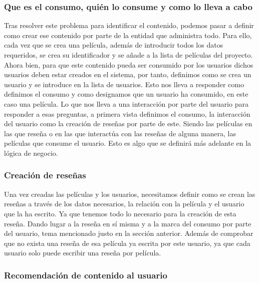 \subsubsection{Que es el consumo, quién lo consume y como lo lleva a cabo}

Tras resolver este problema para identificar el contenido, podemos pasar a definir como crear ese 
contenido por parte de la entidad que administra todo. Para ello, cada vez que se crea una película, 
además de introducir todos los datos requeridos, se crea su identificador y se añade a la lista de 
películas del proyecto. Ahora bien, para que este contenido pueda ser consumido por los usuarios dichos 
usuarios deben estar creados en el sistema, por tanto, definimos como se crea un usuario y se introduce 
en la lista de usuarios. Esto nos lleva a responder como definimos el consumo y como designamos que un 
usuario ha consumido, en este caso una película. Lo que nos lleva a una interacción por parte del 
usuario para responder a esas preguntas, a primera vista definimos el consumo, la interacción del 
usuario como la creación de reseñas por parte de este. Siendo las películas en las que reseña o en las 
que interactúa con las reseñas de alguna manera, las películas que consume el usuario. Esto es algo que 
se definirá más adelante en la lógica de negocio. 

\subsubsection{Creación de reseñas}

Una vez creadas las películas y los usuarios, necesitamos definir como se crean las reseñas a través de 
los datos necesarios, la relación con la película y el usuario que la ha escrito. Ya que tenemos todo 
lo necesario para la creación de esta reseña. Dando lugar a la reseña en sí misma y a la marca del 
consumo por parte del usuario, tema mencionado justo en la sección anterior. Además de comprobar que no 
exista una reseña de esa película ya escrita por este usuario, ya que cada usuario solo puede escribir 
una reseña por película.

\subsubsection{Recomendación de contenido al usuario}

